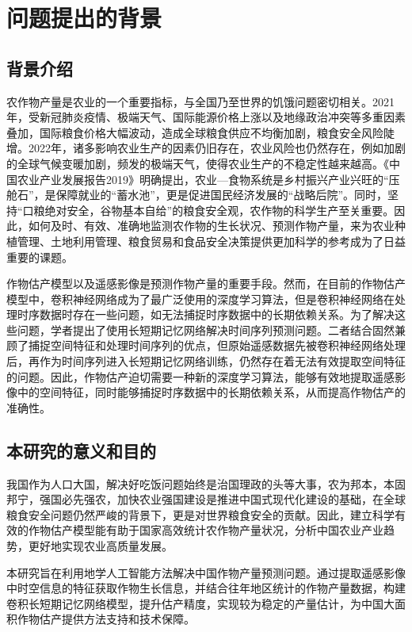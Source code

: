 \section{问题提出的背景}

\subsection{背景介绍}

\par 农作物产量是农业的一个重要指标，与全国乃至世界的饥饿问题密切相关。2021年，受新冠肺炎疫情、极端天气、国际能源价格上涨以及地缘政治冲突等多重因素叠加，国际粮食价格大幅波动，造成全球粮食供应不均衡加剧，粮食安全风险陡增。2022年，诸多影响农业生产的因素仍旧存在，农业风险也仍然存在，例如加剧的全球气候变暖加剧，频发的极端天气，使得农业生产的不稳定性越来越高。《中国农业产业发展报告2019》明确提出，农业—食物系统是乡村振兴产业兴旺的“压舱石”，是保障就业的“蓄水池”，更是促进国民经济发展的“战略后院”。同时，坚持“口粮绝对安全，谷物基本自给”的粮食安全观，农作物的科学生产至关重要。因此，如何及时、有效、准确地监测农作物的生长状况、预测作物产量，来为农业种植管理、土地利用管理、粮食贸易和食品安全决策提供更加科学的参考成为了日益重要的课题。

\par 作物估产模型以及遥感影像是预测作物产量的重要手段。然而，在目前的作物估产模型中，卷积神经网络成为了最广泛使用的深度学习算法，但是卷积神经网络在处理时序数据时存在一些问题，如无法捕捉时序数据中的长期依赖关系。为了解决这些问题，学者提出了使用长短期记忆网络解决时间序列预测问题。二者结合固然兼顾了捕捉空间特征和处理时间序列的优点，但原始遥感数据先被卷积神经网络处理后，再作为时间序列进入长短期记忆网络训练，仍然存在着无法有效提取空间特征的问题。因此，作物估产迫切需要一种新的深度学习算法，能够有效地提取遥感影像中的空间特征，同时能够捕捉时序数据中的长期依赖关系，从而提高作物估产的准确性。

\subsection{本研究的意义和目的}

\par 我国作为人口大国，解决好吃饭问题始终是治国理政的头等大事，农为邦本，本固邦宁，强国必先强农，加快农业强国建设是推进中国式现代化建设的基础，在全球粮食安全问题仍然严峻的背景下，更是对世界粮食安全的贡献。因此，建立科学有效的作物估产模型能有助于国家高效统计农作物产量状况，分析中国农业产业趋势，更好地实现农业高质量发展。

\par 本研究旨在利用地学人工智能方法解决中国作物产量预测问题。通过提取遥感影像中时空信息的特征获取作物生长信息，并结合往年地区统计的作物产量数据，构建卷积长短期记忆网络模型，提升估产精度，实现较为稳定的产量估计，为中国大面积作物估产提供方法支持和技术保障。